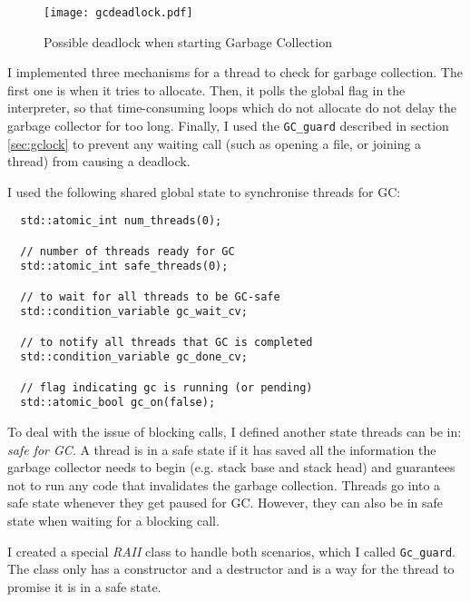 \begin{figure}[H]
  \centering
  \texttt{[image: gcdeadlock.pdf]}
  \caption{Possible deadlock when starting Garbage Collection}
  \label{fig:gcdeadlock}
\end{figure}

I implemented three mechanisms
for a thread to check for garbage collection. The first one is when it tries to allocate. Then, it
polls the global flag in the interpreter, so that time-consuming loops which do not allocate do not
delay the garbage collector for too long. Finally, I used the \verb|GC_guard| described in section
\ref{sec:gclock} to prevent any waiting call (such as opening a file, or joining a thread) from
causing a deadlock.

I used the following shared global state to synchronise threads for GC:
\begin{code}
\begin{verbatim}
  std::atomic_int num_threads(0);

  // number of threads ready for GC
  std::atomic_int safe_threads(0);

  // to wait for all threads to be GC-safe
  std::condition_variable gc_wait_cv;

  // to notify all threads that GC is completed
  std::condition_variable gc_done_cv;

  // flag indicating gc is running (or pending)
  std::atomic_bool gc_on(false);
\end{verbatim}
\end{code}

To deal with the issue of blocking calls, I defined another state threads can be in: \emph{safe for GC}. A thread
is in a safe state if it has saved all the information the garbage collector needs to begin (e.g. stack base
and stack head) and guarantees not to run any code that invalidates the garbage collection. Threads go into a safe
state whenever they get paused for GC. However, they can also be in safe state when waiting for a blocking call.

I created a special \emph{RAII} class to handle both scenarios, which I called \verb|Gc_guard|.
The class only has a constructor and a destructor and is a way for the thread to promise it is in a safe state.

